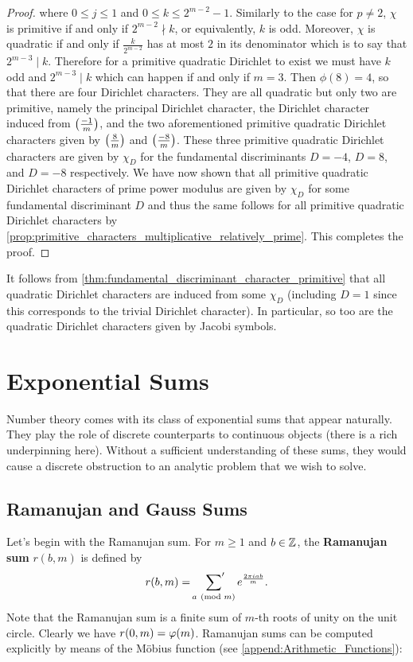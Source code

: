 \begin{proof}
      where $0 \le j \le 1$ and $0 \le k \le 2^{m-2}-1$. Similarly to the case for $p \neq 2$, $\chi$ is primitive if and only if $2^{m-2} \nmid k$, or equivalently, $k$ is odd. Moreover, $\chi$ is quadratic if and only if $\frac{k}{2^{m-2}}$ has at most $2$ in its denominator which is to say that $2^{m-3} \mid k$. Therefore for a primitive quadratic Dirichlet to exist we must have $k$ odd and $2^{m-3} \mid k$ which can happen if and only if $m = 3$. Then $\phi(8) = 4$, so that there are four Dirichlet characters. They are all quadratic but only two are primitive, namely the principal Dirichlet character, the Dirichlet character induced from $\textstyle{\left(\frac{-1}{m}\right)}$, and the two aforementioned primitive quadratic Dirichlet characters given by $\textstyle{\left(\frac{8}{m}\right)}$ and $\textstyle{\left(\frac{-8}{m}\right)}$. These three primitive quadratic Dirichlet characters are given by $\chi_{D}$ for the fundamental discriminants $D = -4$, $D = 8$, and $D = -8$ respectively. We have now shown that all primitive quadratic Dirichlet characters of prime power modulus are given by $\chi_{D}$ for some fundamental discriminant $D$ and thus the same follows for all primitive quadratic Dirichlet characters by \cref{prop:primitive_characters_multiplicative_relatively_prime}. This completes the proof.
    \end{proof}

    It follows from \cref{thm:fundamental_discriminant_character_primitive} that all quadratic Dirichlet characters are induced from some $\chi_{D}$ (including $D = 1$ since this corresponds to the trivial Dirichlet character). In particular, so too are the quadratic Dirichlet characters given by Jacobi symbols.
  \section{Exponential Sums}
    Number theory comes with its class of exponential sums that appear naturally. They play the role of discrete counterparts to continuous objects (there is a rich underpinning here). Without a sufficient understanding of these sums, they would cause a discrete obstruction to an analytic problem that we wish to solve.
    \subsection*{Ramanujan and Gauss Sums}
      Let's begin with the Ramanujan sum. For $m \ge 1$ and $b \in \mathbb{Z}$, the \textbf{Ramanujan sum} $r(b,m)$ is defined by
      \[
        r(b,m) = \sideset{}{'}\sum_{a \ (\mathrm{mod}\text{ }m)}e^{\frac{2\pi iab}{m}}.
      \]
      Note that the Ramanujan sum is a finite sum of $m$-th roots of unity on the unit circle. Clearly we have $r(0,m) = \varphi(m)$. Ramanujan sums can be computed explicitly by means of the M\"obius function (see \cref{append:Arithmetic_Functions}):

